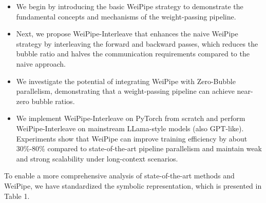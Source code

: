 \documentclass[sigplan,review,anonymous]{acmart}
\begin{document}
\begin{itemize}
    \item We begin by introducing the basic WeiPipe strategy to demonstrate the fundamental concepts and mechanisms of the weight-passing pipeline.
    \item Next, we propose WeiPipe-Interleave that enhances the naive WeiPipe strategy by interleaving the forward and backward passes, which reduces the bubble ratio and halves the communication requirements compared to the naive approach.
    \item We investigate the potential of integrating WeiPipe with Zero-Bubble parallelism, demonstrating that a weight-passing pipeline can achieve near-zero bubble ratios.
    \item We implement WeiPipe-Interleave on PyTorch from scratch and perform WeiPipe-Interleave on mainstream LLama-style\cite{touvron2023llama2openfoundation} models (also GPT-like). Experiments show that WeiPipe can improve training efficiency by about 30\%-80\% compared to state-of-the-art pipeline parallelism and maintain weak and strong scalability under long-context scenarios.
\end{itemize}


To enable a more comprehensive analysis of state-of-the-art methods and WeiPipe, we have standardized the symbolic representation, which is presented in Table 1. 
\end{document}
